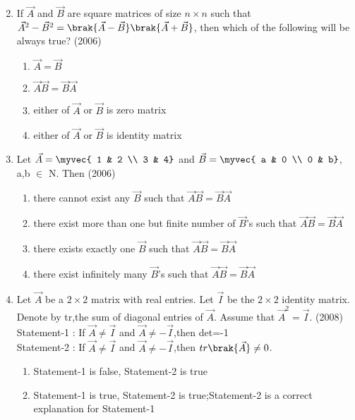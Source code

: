 \begin{enumerate}[label=\thesubsection.\arabic*.,ref=\thesubsection.\theenumi]
\begin{multicols}{4}
\begin{enumerate}
		\end{enumerate}
\end{multicols}
	\item If $\vec{A}$ and $\vec{B}$ are square matrices of size $n \times n$ such that $\vec{A}^2-\vec{B}^2=\brak{\vec{A}-\vec{B}}\brak{\vec{A}+\vec{B}}$, then which of the following will be always true? \hfill{(2006)}
\begin{multicols}{2}
		\begin{enumerate}
			\item $\vec{A}=\vec{B}$
			\item $\vec{A}\vec{B}=\vec{B}\vec{A}$
			\item either of $\vec{A}$ or $\vec{B}$ is zero matrix
			\item either of $\vec{A}$ or $\vec{B}$ is identity matrix
		\end{enumerate}
\end{multicols}
	\item Let $\vec{A}=\myvec{
			1 & 2 \\
			3 & 4}$ and $\vec{B}=\myvec{
			a & 0 \\
			0 & b}$, a,b $\in$ N. Then \hfill{(2006)}
		\begin{enumerate}
			\item there cannot exist any $\vec{B}$ such that $\vec{A}\vec{B}=\vec{B}\vec{A}$
			\item there exist more than one but finite number of $\vec{B}$'s such that $\vec{A}\vec{B}=\vec{B}\vec{A}$
			\item there exists exactly one $\vec{B}$ such that $\vec{A}\vec{B}=\vec{B}\vec{A}$
			\item there exist infinitely many $\vec{B}$'s such that $\vec{A}\vec{B}=\vec{B}\vec{A}$
		\end{enumerate}
	\item Let $\vec{A}$ be a $2 \times 2$ matrix with real entries. Let $\vec{I}$ be the $2 \times 2$ identity matrix. Denote by tr,the sum of diagonal entries of $\vec{A}$. Assume that $\vec{A}^2 = \vec{I}$. \hfill{(2008)} \\
		Statement-1 : If $\vec{A} \neq \vec{I}$ and $\vec{A} \neq -\vec{I}$,then det=-1 \\
		Statement-2 : If $\vec{A} \neq \vec{I}$ and $\vec{A} \neq -\vec{I}$,then $tr\brak{\vec{A}} \neq 0$.
		\begin{enumerate}
			\item Statement-1 is false, Statement-2 is true
			\item Statement-1 is true, Statement-2 is true;Statement-2 is a correct explanation for Statement-1

\end{enumerate}
\end{enumerate}
